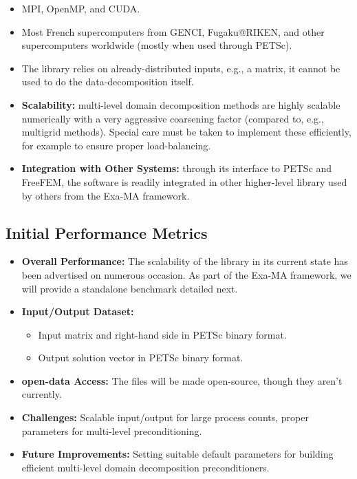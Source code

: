 \begin{itemize}
    \item MPI, OpenMP, and CUDA.
    \item Most French supercomputers from GENCI, Fugaku@RIKEN, and other supercomputers worldwide (mostly when used through PETSc).
    \item The library relies on already-distributed inputs, e.g., a matrix, it cannot be used to do the data-decomposition itself.
    \item \textbf{Scalability:} multi-level domain decomposition methods are highly scalable numerically with a very aggressive coarsening factor (compared to, e.g., multigrid methods). Special care must be taken to implement these efficiently, for example to ensure proper load-balancing.
    \item \textbf{Integration with Other Systems:} through its interface to PETSc and FreeFEM, the software is readily integrated in other higher-level library used by others from the Exa-MA framework.
\end{itemize}


\subsection{Initial Performance Metrics}
\label{sec:WP3:HPDDM:metrics}

\begin{itemize}
    \item \textbf{Overall Performance:} The scalability of the library in its current state has been advertised on numerous occasion. As part of the Exa-MA framework, we will provide a standalone benchmark detailed next.
    \item \textbf{Input/Output Dataset:}
        \begin{itemize}
            \item Input matrix and right-hand side in PETSc binary format.
            \item Output solution vector in PETSc binary format.
        \end{itemize}
    \item \textbf{open-data Access:} The files will be made open-source, though they aren't currently.
    \item \textbf{Challenges:} Scalable input/output for large process counts, proper parameters for multi-level preconditioning.
    \item \textbf{Future Improvements:} Setting suitable default parameters for building efficient multi-level domain decomposition preconditioners.
\end{itemize}

